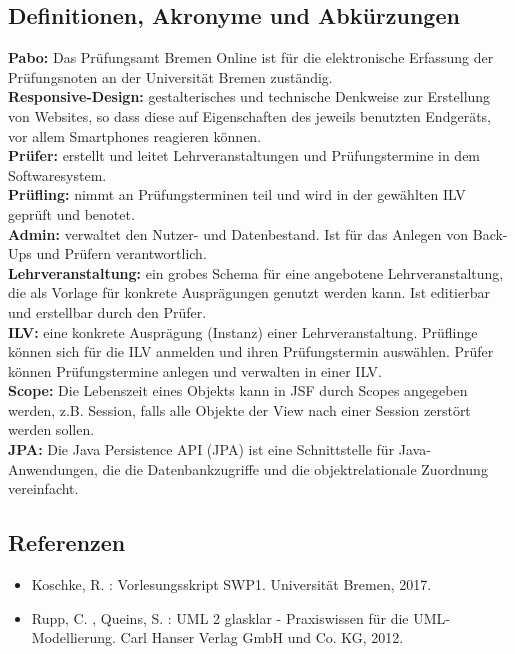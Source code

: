 %

\subsection{Definitionen, Akronyme und Abkürzungen}
{ 
\textbf{Pabo:}  Das Prüfungsamt Bremen Online ist für die elektronische Erfassung der Prüfungsnoten an der Universität Bremen zuständig.\\
\textbf{Responsive-Design:}  gestalterisches und technische Denkweise zur Erstellung von Websites, so dass diese auf Eigenschaften des jeweils benutzten Endgeräts, vor allem Smartphones reagieren können.\\
\textbf{Prüfer:} erstellt und leitet Lehrveranstaltungen und Prüfungstermine in dem Softwaresystem. \\ 
\textbf{Prüfling:} nimmt an Prüfungsterminen teil und wird in der gewählten ILV geprüft und benotet. \\ 
\textbf{Admin:} verwaltet den Nutzer- und Datenbestand. Ist für das Anlegen von Back-Ups und Prüfern verantwortlich. \\
\textbf{Lehrveranstaltung:} ein grobes Schema für eine angebotene Lehrveranstaltung, die als Vorlage für konkrete Ausprägungen genutzt werden kann. Ist editierbar und erstellbar durch den Prüfer. \\
\textbf{ILV:} eine konkrete Ausprägung (Instanz) einer Lehrveranstaltung. Prüflinge können sich für die ILV anmelden und ihren Prüfungstermin auswählen. Prüfer können Prüfungstermine anlegen und verwalten in einer ILV. \\
\textbf{Scope:} Die Lebenszeit eines Objekts kann in JSF durch Scopes angegeben werden, z.B. Session, falls alle Objekte der View nach einer Session zerstört werden sollen.\\
\textbf{JPA:} Die Java Persistence API (JPA) ist eine Schnittstelle für Java-Anwendungen, die die Datenbankzugriffe und die objektrelationale Zuordnung vereinfacht.
}
\subsection{Referenzen}
\begin{itemize}
\item Koschke, R. : Vorlesungsskript SWP1. Universität Bremen, 2017.\\
\item Rupp, C. , Queins, S. : UML 2 glasklar - Praxiswissen für die UML-Modellierung. Carl Hanser Verlag GmbH und Co. KG, 2012.\\
\end{itemize}

